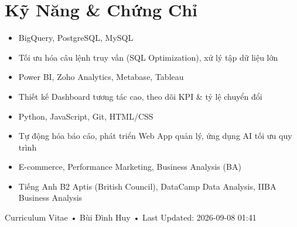 \documentclass[11pt,a4paper]{article}
\begin{document}
\section*{Kỹ Năng \& Chứng Chỉ}
\color{darkgray} \begin{itemize}
  \item BigQuery, PostgreSQL, MySQL
  \item Tối ưu hóa câu lệnh truy vấn (SQL Optimization), xử lý tập dữ liệu lớn
\end{itemize}
\begin{itemize}
  \item Power BI, Zoho Analytics, Metabase, Tableau
  \item Thiết kế Dashboard tương tác cao, theo dõi KPI \& tỷ lệ chuyển đổi
\end{itemize}
\begin{itemize}
  \item Python, JavaScript, Git, HTML/CSS
  \item Tự động hóa báo cáo, phát triển Web App quản lý, ứng dụng AI tối ưu quy trình
\end{itemize}
\begin{itemize}
  \item E-commerce, Performance Marketing, Business Analysis (BA)
  \item Tiếng Anh B2 Aptis (British Council), DataCamp Data Analysis, IIBA Business Analysis
\end{itemize}

\vfill
\begin{center}
    \tiny \color{mediumgray} Curriculum Vitae • Bùi Đình Huy • Last Updated: 2026-09-08 01:41
\end{center}
\end{document}
